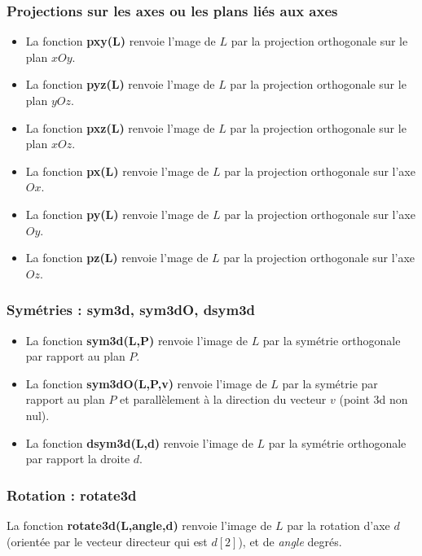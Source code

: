 \documentclass[%
10pt,%
a4paper,%
french,%
]%
{article}%
\begin{document}
\subsubsection{Projections sur les axes ou les plans liés aux axes}

\begin{itemize}
    \item La fonction \textbf{pxy(L)} renvoie l'mage de $L$ par la projection orthogonale sur le plan $xOy$.
    \item La fonction \textbf{pyz(L)} renvoie l'mage de $L$ par la projection orthogonale sur le plan $yOz$.
    \item La fonction \textbf{pxz(L)} renvoie l'mage de $L$ par la projection orthogonale sur le plan $xOz$.
\item La fonction \textbf{px(L)} renvoie l'mage de $L$ par la projection orthogonale sur l'axe $Ox$.
\item La fonction \textbf{py(L)} renvoie l'mage de $L$ par la projection orthogonale sur l'axe $Oy$.
\item La fonction \textbf{pz(L)} renvoie l'mage de $L$ par la projection orthogonale sur l'axe $Oz$.
\end{itemize}

\subsubsection{Symétries : sym3d, sym3dO, dsym3d}

\begin{itemize}
    \item La fonction \textbf{sym3d(L,P)} renvoie l'image de $L$ par la symétrie orthogonale par rapport au plan $P$.
    \item La fonction \textbf{sym3dO(L,P,v)} renvoie l'image de $L$ par la symétrie par rapport au plan $P$ et parallèlement à la direction du vecteur $v$ (point 3d non nul).
    \item La fonction \textbf{dsym3d(L,d)} renvoie l'image de $L$ par la symétrie orthogonale par rapport la droite $d$.
\end{itemize}

\subsubsection{Rotation : rotate3d}

La fonction \textbf{rotate3d(L,angle,d)} renvoie l'image de $L$ par la rotation d'axe $d$ (orientée par le vecteur directeur qui est $d[2]$), et de \emph{angle} degrés.
\end{document}
